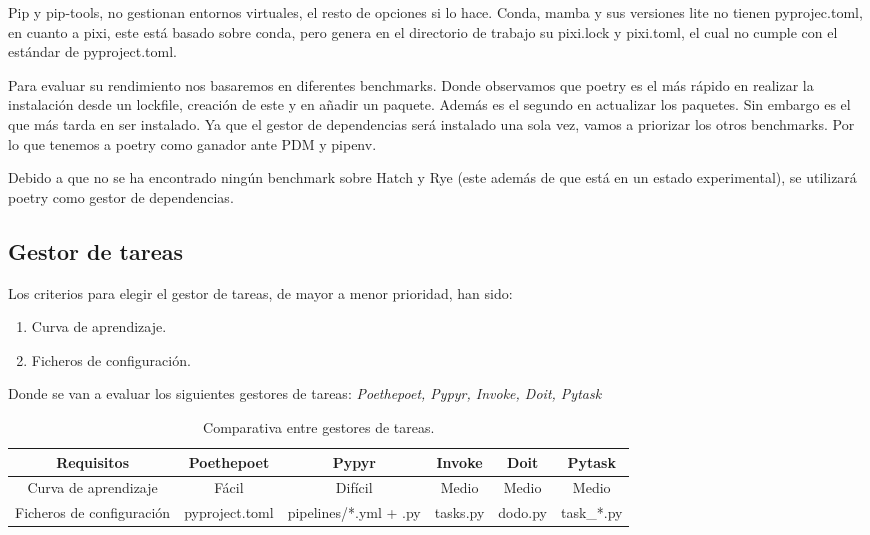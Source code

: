 Pip y pip-tools, no gestionan entornos virtuales, el resto de opciones si lo hace. Conda, mamba y sus versiones lite no tienen pyprojec.toml, en cuanto a pixi, este está basado sobre conda, pero genera en el directorio de trabajo su pixi.lock y pixi.toml, el cual no cumple con el estándar de pyproject.toml.

Para evaluar su rendimiento nos basaremos en diferentes benchmarks\cite{pm-benchmark-shootout}. Donde observamos que poetry es el más rápido en realizar la instalación desde un lockfile, creación de este y en añadir un paquete. Además es el segundo en actualizar los paquetes. Sin embargo es el que más tarda en ser instalado. Ya que el gestor de dependencias será instalado una sola vez, vamos a priorizar los otros benchmarks. Por lo que tenemos a poetry como ganador ante PDM y pipenv.

Debido a que no se ha encontrado ningún benchmark sobre Hatch y Rye (este además de que está en un estado experimental), se utilizará poetry como gestor de dependencias.

\subsection{Gestor de tareas}
Los criterios para elegir el gestor de tareas, de mayor a menor prioridad, han sido:
\begin{enumerate}
    \item Curva de aprendizaje.
    \item Ficheros de configuración.
\end{enumerate}

Donde se van a evaluar los siguientes gestores de tareas: \textit{Poethepoet, Pypyr, Invoke, Doit, Pytask}

\begin{table}[H]
    \centering
    \begin{adjustbox}{width=\textwidth, totalheight=\textheight, keepaspectratio}
        \begin{tabular}{|c|c|c|c|c|c|}
        \hline
        Requisitos & Poethepoet & Pypyr & Invoke & Doit & Pytask\\
        \hline
        Curva de aprendizaje & Fácil & Difícil & Medio & Medio & Medio \\
        Ficheros de configuración & pyproject.toml & pipelines/*.yml + .py & tasks.py & dodo.py & task\_*.py \\
        \hline
        \end{tabular}
    \end{adjustbox}
      \caption{Comparativa entre gestores de tareas.}
\end{table}

